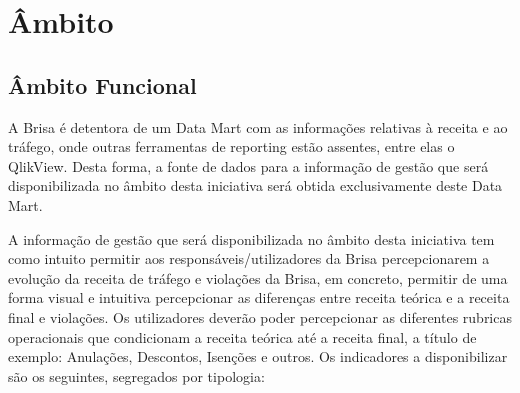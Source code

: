 \chapter{Âmbito}
\label{cap3}

\section{Âmbito Funcional}
\par A Brisa é detentora de um Data Mart com as informações relativas à receita e ao tráfego, onde outras ferramentas de reporting estão assentes, entre elas o QlikView. Desta forma, a fonte de dados para a informação de gestão que será disponibilizada no âmbito desta iniciativa será obtida exclusivamente deste Data Mart. 
\par A informação de gestão que será disponibilizada no âmbito desta iniciativa tem como intuito permitir aos responsáveis/utilizadores da Brisa percepcionarem a evolução da receita de tráfego e violações da Brisa, em concreto, permitir de uma forma visual e intuitiva percepcionar as diferenças entre receita teórica e a receita final e violações. Os utilizadores deverão poder percepcionar as diferentes rubricas operacionais que condicionam a receita teórica até a receita final, a título de exemplo: Anulações, Descontos, Isenções e outros.
Os indicadores a disponibilizar são os seguintes, segregados por tipologia:
